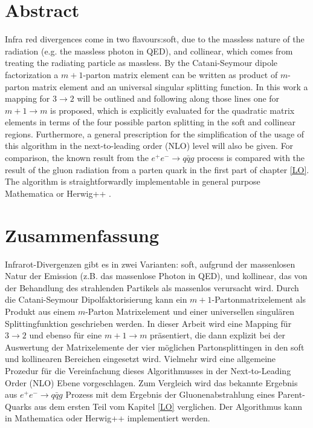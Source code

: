 \thispagestyle{empty}
\section*{\Large \bfseries \centering Abstract}
\vspace{1cm}
Infra red divergences come in two flavours:soft, due to the  massless  nature  of  the  radiation  (e.g.  the  massless photon in QED), and collinear, which comes from treating the radiating particle as massless.
By the Catani-Seymour dipole factorization a $m+1$-parton matrix element can be written as product of $m$-parton matrix element and an universal singular splitting function.  
In this work a mapping for $ 3\rightarrow 2 $ will be outlined and following along those lines one for $ m+1\rightarrow m $ is proposed, which is explicitly evaluated for the quadratic matrix elements in terms of the four possible parton splitting in the soft and collinear regions. Furthermore, a general prescription for the simplification of the usage of this algorithm in the next-to-leading order (NLO) level will also be given.  For comparison, the known result from the $ e^{+}e^{-} \rightarrow q \bar{q} g $ process is compared with the result of the gluon radiation from a parten quark in the first part of chapter \ref{LO}. 
The algorithm is straightforwardly implementable in general purpose \textup{Mathematica} or \textup{Herwig++} \cite{Bahr:2008pv}.

\vspace{3cm}
\section*{\Large \bfseries \centering Zusammenfassung}
\vspace{1cm}
Infrarot-Divergenzen gibt es in zwei Varianten: soft, aufgrund der massenlosen Natur der Emission (z.B. das massenlose Photon in QED), und kollinear, das von der Behandlung des strahlenden Partikels als massenlos verursacht wird.
Durch die Catani-Seymour Dipolfaktorisierung kann ein $m+1$-Partonmatrixelement als Produkt aus einem $m$-Parton Matrixelement und einer universellen singul\"aren Splittingfunktion geschrieben werden.  
In dieser Arbeit wird eine Mapping für $ 3\rightarrow 2 $ und ebenso f\"ur eine $ m+1\rightarrow m $ pr\"asentiert, die dann explizit bei der Auswertung der Matrixelemente der vier möglichen Partonsplittingen in den soft und kollinearen Bereichen eingesetzt wird. Vielmehr wird eine allgemeine Prozedur für die Vereinfachung dieses Algorithmusses in der Next-to-Leading Order (NLO) Ebene vorgeschlagen.  Zum Vergleich wird das bekannte Ergebnis aus $ e^{+}e^{-} \rightarrow q \bar{q} g $ Prozess mit dem Ergebnis der Gluonenabstrahlung eines Parent-Quarks aus dem ersten Teil vom Kapitel \ref{LO} verglichen. 
Der Algorithmus kann in \textup{Mathematica} oder \textup{Herwig++} \cite{Bahr:2008pv} implementiert werden.